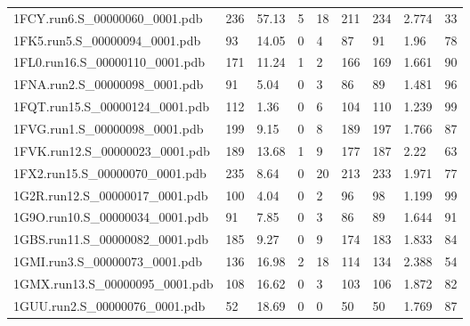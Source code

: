 \documentclass{bioinfo}
\begin{document}
\begin{table}[!t]
{\begin{tabular}{lllllllll}
    1FCY.run6.S\_00000060\_0001.pdb & 236      & 57.13      & 5           & 18          & 211         & 234     & 2.774           & 33           \\
    1FK5.run5.S\_00000094\_0001.pdb & 93       & 14.05      & 0           & 4           & 87          & 91      & 1.96            & 78           \\
    1FL0.run16.S\_00000110\_0001.pdb & 171      & 11.24      & 1           & 2           & 166         & 169     & 1.661           & 90           \\
    1FNA.run2.S\_00000098\_0001.pdb & 91       & 5.04       & 0           & 3           & 86          & 89      & 1.481           & 96           \\
    1FQT.run15.S\_00000124\_0001.pdb & 112      & 1.36       & 0           & 6           & 104         & 110     & 1.239           & 99           \\
    1FVG.run1.S\_00000098\_0001.pdb & 199      & 9.15       & 0           & 8           & 189         & 197     & 1.766           & 87           \\
    1FVK.run12.S\_00000023\_0001.pdb & 189      & 13.68      & 1           & 9           & 177         & 187     & 2.22            & 63           \\
    1FX2.run15.S\_00000070\_0001.pdb & 235      & 8.64       & 0           & 20          & 213         & 233     & 1.971           & 77           \\
    1G2R.run12.S\_00000017\_0001.pdb & 100      & 4.04       & 0           & 2           & 96          & 98      & 1.199           & 99           \\
    1G9O.run10.S\_00000034\_0001.pdb & 91       & 7.85       & 0           & 3           & 86          & 89      & 1.644           & 91           \\
    1GBS.run11.S\_00000082\_0001.pdb & 185      & 9.27       & 0           & 9           & 174         & 183     & 1.833           & 84           \\
    1GMI.run3.S\_00000073\_0001.pdb & 136      & 16.98      & 2           & 18          & 114         & 134     & 2.388           & 54           \\
    1GMX.run13.S\_00000095\_0001.pdb & 108      & 16.62      & 0           & 3           & 103         & 106     & 1.872           & 82           \\
    1GUU.run2.S\_00000076\_0001.pdb & 52       & 18.69      & 0           & 0           & 50          & 50      & 1.769           & 87           \\

\end{tabular}}
\end{table}
\end{document}
